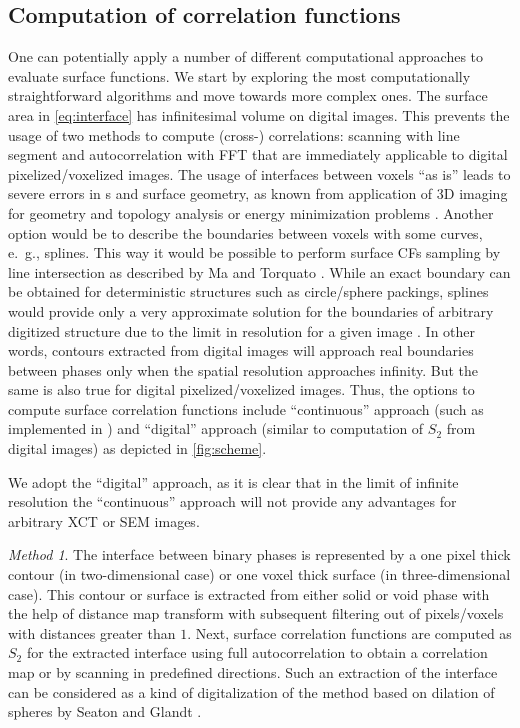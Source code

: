 \documentclass[reprint,amsmath,amssymb,aps,pre]{revtex4-1}
\begin{document}
\subsection{Computation of correlation functions}
One can potentially apply a number of different computational approaches to
evaluate surface functions. We start by exploring the most computationally
straightforward algorithms and move towards more complex ones. The surface area
in \cref{eq:interface} has infinitesimal volume on digital images. This prevents
the usage of two methods to compute (cross-) correlations: scanning with line
segment and autocorrelation with FFT that are immediately applicable to digital
pixelized/voxelized images. The usage of interfaces between voxels ``as is''
leads to severe errors in s and surface geometry, as known from application of
3D imaging for geometry and topology analysis \cite{AWR_PNM} or energy
minimization problems \cite{jagged_surfaces}. Another option would be to
describe the boundaries between voxels with some curves, e.~g., splines. This
way it would be possible to perform surface CFs sampling by line intersection as
described by Ma and Torquato \cite{Ma_Torq}. While an exact boundary can be
obtained for deterministic structures such as circle/sphere packings, splines
would provide only a very approximate solution for the boundaries of arbitrary
digitized structure due to the limit in resolution for a given image
\cite{Eusosoil2012}. In other words, contours extracted from digital images will
approach real boundaries between phases only when the spatial resolution
approaches infinity. But the same is also true for digital pixelized/voxelized
images. Thus, the options to compute surface correlation functions include
``continuous'' approach (such as implemented in \cite{Ma_Torq}) and ``digital''
approach (similar to computation of $S_2$ from digital images) as depicted in
\cref{fig:scheme}.

We adopt the ``digital'' approach, as it is clear that in the limit of infinite
resolution the ``continuous'' approach will not provide any advantages for
arbitrary XCT or SEM images.


\textit{Method 1}. The interface between binary phases is represented by a one
pixel thick contour (in two-dimensional case) or one voxel thick surface (in
three-dimensional case). This contour or surface is extracted from either solid
or void phase with the help of distance map transform with subsequent filtering
out of pixels/voxels with distances greater than $1$. Next, surface correlation
functions are computed as $S_2$ for the extracted interface using full
autocorrelation to obtain a correlation map or by scanning in predefined
directions. Such an extraction of the interface can be considered as a kind of
digitalization of the method based on dilation of spheres by Seaton and Glandt
\cite{SG1986}.
\end{document}
